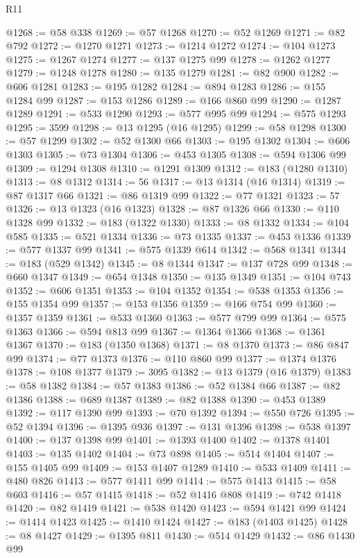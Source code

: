 \begin{lexlean}{R11}
\begin{coremodule}
@1268 := @58 @338
@1269 := @57 @1268
@1270 := @52 @1269
@1271 := @82 @792
@1272 := @1270 @1271
@1273 := @1214 @1272
@1274 := @104 @1273
@1275 := @1267 @1274
@1277 := @137 @1275 @99
@1278 := @1262 @1277
@1279 := @1248 @1278
@1280 := @135 @1279
@1281 := @82 @900
@1282 := @606 @1281
@1283 := @195 @1282
@1284 := @894 @1283
@1286 := @155 @1284 @99
@1287 := @153 @1286
@1289 := @166 @860 @99
@1290 := @1287 @1289
@1291 := @533 @1290
@1293 := @577 @995 @99
@1294 := @575 @1293
@1295 := 3599
@1298 := @13 @1295 (@16 @1295)
@1299 := @58 @1298
@1300 := @57 @1299
@1302 := @52 @1300 @66
@1303 := @195 @1302
@1304 := @606 @1303
@1305 := @73 @1304
@1306 := @453 @1305
@1308 := @594 @1306 @99
@1309 := @1294 @1308
@1310 := @1291 @1309
@1312 := @183 (@1280 @1310)
@1313 := @8 @1312
@1314 := 56
@1317 := @13 @1314 (@16 @1314)
@1319 := @87 @1317 @66
@1321 := @86 @1319 @99
@1322 := @77 @1321
@1323 := 57
@1326 := @13 @1323 (@16 @1323)
@1328 := @87 @1326 @66
@1330 := @110 @1328 @99
@1332 := @183 (@1322 @1330)
@1333 := @8 @1332
@1334 := @104 @585
@1335 := @521 @1334
@1336 := @73 @1335
@1337 := @453 @1336
@1339 := @577 @1337 @99
@1341 := @575 @1339 @614
@1342 := @568 @1341
@1344 := @183 (@529 @1342)
@1345 := @8 @1344
@1347 := @137 @728 @99
@1348 := @660 @1347
@1349 := @654 @1348
@1350 := @135 @1349
@1351 := @104 @743
@1352 := @606 @1351
@1353 := @104 @1352
@1354 := @538 @1353
@1356 := @155 @1354 @99
@1357 := @153 @1356
@1359 := @166 @754 @99
@1360 := @1357 @1359
@1361 := @533 @1360
@1363 := @577 @799 @99
@1364 := @575 @1363
@1366 := @594 @813 @99
@1367 := @1364 @1366
@1368 := @1361 @1367
@1370 := @183 (@1350 @1368)
@1371 := @8 @1370
@1373 := @86 @847 @99
@1374 := @77 @1373
@1376 := @110 @860 @99
@1377 := @1374 @1376
@1378 := @108 @1377
@1379 := 3095
@1382 := @13 @1379 (@16 @1379)
@1383 := @58 @1382
@1384 := @57 @1383
@1386 := @52 @1384 @66
@1387 := @82 @1386
@1388 := @689 @1387
@1389 := @82 @1388
@1390 := @453 @1389
@1392 := @117 @1390 @99
@1393 := @70 @1392
@1394 := @550 @726
@1395 := @52 @1394
@1396 := @1395 @936
@1397 := @131 @1396
@1398 := @538 @1397
@1400 := @137 @1398 @99
@1401 := @1393 @1400
@1402 := @1378 @1401
@1403 := @135 @1402
@1404 := @73 @898
@1405 := @514 @1404
@1407 := @155 @1405 @99
@1409 := @153 @1407 @1289
@1410 := @533 @1409
@1411 := @480 @826
@1413 := @577 @1411 @99
@1414 := @575 @1413
@1415 := @58 @603
@1416 := @57 @1415
@1418 := @52 @1416 @808
@1419 := @742 @1418
@1420 := @82 @1419
@1421 := @538 @1420
@1423 := @594 @1421 @99
@1424 := @1414 @1423
@1425 := @1410 @1424
@1427 := @183 (@1403 @1425)
@1428 := @8 @1427
@1429 := @1395 @811
@1430 := @514 @1429
@1432 := @86 @1430 @99

\end{coremodule}
\end{lexlean}
